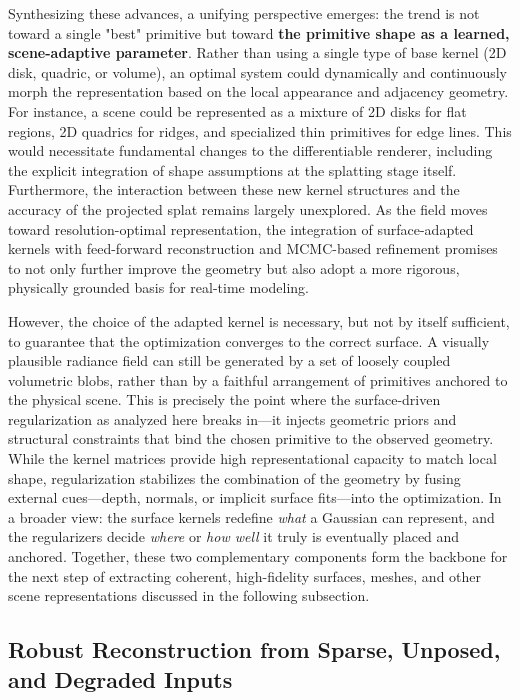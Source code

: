 \documentclass[11pt,a4paper]{article}
\begin{document}
Synthesizing these advances, a unifying perspective emerges: the trend is not toward a single "best" primitive but toward \textbf{the primitive shape as a learned, scene-adaptive parameter}. Rather than using a single type of base kernel (2D disk, quadric, or volume), an optimal system could dynamically and continuously morph the representation based on the local appearance and adjacency geometry. For instance, a scene could be represented as a mixture of 2D disks for flat regions, 2D quadrics for ridges, and specialized thin primitives for edge lines. This would necessitate fundamental changes to the differentiable renderer, including the explicit integration of shape assumptions at the splatting stage itself. Furthermore, the interaction between these new kernel structures and the accuracy of the projected splat remains largely unexplored. As the field moves toward resolution-optimal representation, the integration of surface-adapted kernels with feed-forward reconstruction \cite{arxiv:2604.03069v1} and MCMC-based refinement \cite{arxiv:2404.09591v3} promises to not only further improve the geometry but also adopt a more rigorous, physically grounded basis for real-time modeling.

However, the choice of the adapted kernel is necessary, but not by itself sufficient, to guarantee that the optimization converges to the correct surface. A visually plausible radiance field can still be generated by a set of loosely coupled volumetric blobs, rather than by a faithful arrangement of primitives anchored to the physical scene. This is precisely the point where the surface-driven regularization as analyzed here breaks in---it injects geometric priors and structural constraints that bind the chosen primitive to the observed geometry. While the kernel matrices provide high representational capacity to match local shape, regularization stabilizes the combination of the geometry by fusing external cues---depth, normals, or implicit surface fits---into the optimization. In a broader view: the surface kernels redefine \emph{what} a Gaussian can represent, and the regularizers decide \emph{where} or \emph{how well} it truly is eventually placed and anchored. Together, these two complementary components form the backbone for the next step of extracting coherent, high-fidelity surfaces, meshes, and other scene representations discussed in the following subsection.


\subsection{Robust Reconstruction from Sparse, Unposed, and Degraded Inputs}
\end{document}
